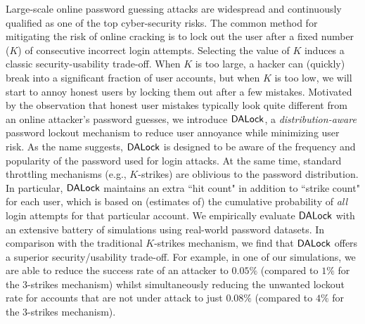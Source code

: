 
Large-scale online password guessing attacks are widespread and continuously qualified as one of the top cyber-security risks. The common method for mitigating the risk of online cracking is to lock out the user after a fixed number ($K$) of consecutive incorrect login attempts. Selecting the value of $K$ induces a classic security-usability trade-off. When $K$ is too large, a hacker can (quickly) break into a significant fraction of user accounts, but when $K$ is too low, we will start to annoy honest users by locking them out after a few mistakes. Motivated by the observation that honest user mistakes typically look quite different from an online attacker's password guesses, we introduce $\mathsf{DALock}$, a {\em distribution-aware} password lockout mechanism to reduce user annoyance while minimizing user risk. As the name suggests, $\mathsf{DALock}$ is designed to be aware of the frequency and popularity of the password used for login attacks. At the same time, standard throttling mechanisms (e.g., $K$-strikes) are oblivious to the password distribution. In particular, $\mathsf{DALock}$ maintains an extra ``hit count" in addition to ``strike count" for each user, which is based on (estimates of) the cumulative probability of {\em all} login attempts for that particular account. We empirically evaluate $\mathsf{DALock}$ with an extensive battery of simulations using real-world password datasets. In comparison with the traditional $K$-strikes mechanism, we find that $\mathsf{DALock}$ offers a superior security/usability trade-off. For example, in one of our simulations, we are able to reduce the success rate of an attacker to $0.05\%$ (compared to $1\%$ for the $3$-strikes mechanism) whilst simultaneously reducing the unwanted lockout rate for accounts that are not under attack to just $0.08\%$ (compared to $4\%$ for the $3$-strikes mechanism).  